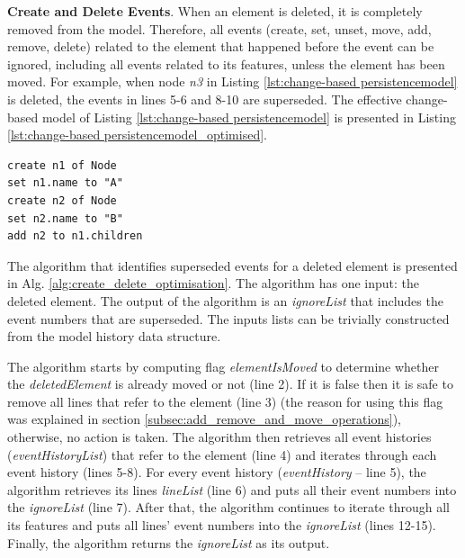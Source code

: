 \documentclass[12pt, a4paper]{report} \usepackage[titletoc]{appendix}
\begin{document}
\textbf{Create and Delete Events}\label{subsec:create_and_delete_operations}. When an element is deleted, it is completely removed from the model. Therefore, all events (create, set, unset, move, add, remove, delete) related to the element that happened before the event can be ignored, including all events related to its features, unless the element has been moved. For example, when node \emph{n3} in Listing \ref{lst:change-based persistencemodel}  is deleted, the events in lines 5-6 and 8-10 are superseded. The effective change-based model of Listing \ref{lst:change-based persistencemodel} is presented in Listing \ref{lst:change-based persistencemodel_optimised}.

\begin{lstlisting}[style=eol,caption={Change-based representation of the model of Fig. \ref{fig:initial_model} after removal of node \emph{n5}.},label=lst:change-based persistencemodel_optimised]
create n1 of Node
set n1.name to "A"
create n2 of Node
set n2.name to "B"
add n2 to n1.children
\end{lstlisting}

The algorithm that identifies superseded events for a deleted element is presented in Alg. \ref{alg:create_delete_optimisation}. The algorithm has one input: the deleted element. The output of the algorithm is an \emph{ignoreList} that includes the event numbers that are superseded. The inputs lists can be trivially constructed from the model history data structure.

The algorithm starts by computing flag \emph{elementIsMoved} to determine whether the \emph{deletedElement} is already moved or not (line 2).
If it is false then it is safe to remove all lines that refer to the element (line 3) (the reason for using this flag was explained in section \ref{subsec:add_remove_and_move_operations}), otherwise, no action is taken. The algorithm then retrieves all event histories (\emph{eventHistoryList}) that refer to the element (line 4) and iterates through each event history (lines 5-8). For every event history (\emph{eventHistory} -- line 5), the algorithm retrieves its lines \emph{lineList} (line 6) and puts all their event numbers into the \emph{ignoreList} (line 7). After that, the algorithm continues to iterate through all its features and puts all lines' event numbers into the \emph{ignoreList} (lines 12-15). Finally, the algorithm returns the \emph{ignoreList} as its output.
\end{document}
